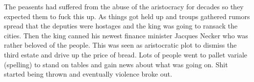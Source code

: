 \documentclass{article}
\begin{document}
The peasents had suffered from the abuse of the aristocracy for decades so they expected them to fuck this up. As things got held up and troups gathered rumors spread that the deputies were hostages and the king was going to ransack the cities. Then the king canned his newest finance minister Jacques Necker who was rather beloved of the people.  This was seen as aristocratic plot to dismiss the third estate and drive up the price of bread. Lots of people went to pallet variale (spelling) to stand on tables and gain news about what was going on. Shit started being thrown and eventually violence broke out.
\end{document}
